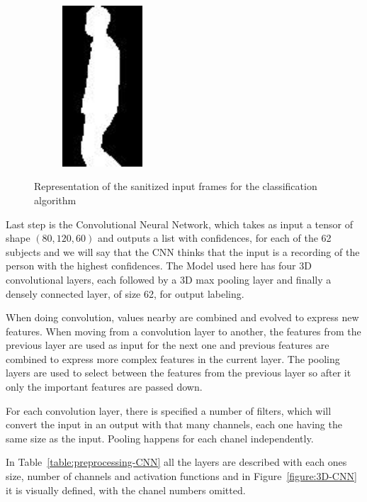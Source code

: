 \documentclass[12pt]{article}
\theoremstyle{definition}
\begin{document}
\begin{figure}[h]
\begin{subfigure}{3cm}
			\caption{}
		\end{subfigure}
		\hspace{0.5cm}
		\begin{subfigure}{3cm}
			\centering\includegraphics[width=3cm]{processed-slihouettes/90-4.jpg}
			\caption{}
		\end{subfigure}

		\caption{Representation of the sanitized input frames for the classification algorithm}
		\label{figure:preprocessed-silhouettes}
	\end{figure}

	Last step is the Convolutional Neural Network, which takes as input a tensor of shape $(80, 120, 60)$ and outputs a list with confidences, for each of the 62 subjects and we will say that the CNN thinks that the input is a recording of the person with the highest confidences.
	The Model used here has four 3D convolutional layers, each followed by a 3D max pooling layer and finally a densely connected layer, of size 62, for output labeling.

	When doing convolution, values nearby are combined and evolved to express new features. When moving from a convolution layer to another, the features from the previous layer are used as input for the next one and previous features are combined to express more complex features in the current layer. The pooling layers are used to select between the features from the previous layer so after it only the important features are passed down.

	For each convolution layer, there is specified a number of filters, which will convert the input in an output with that many channels, each one having the same size as the input. Pooling happens for each chanel independently.

	In Table~\ref{table:preprocessing-CNN} all the layers are described with each ones size, number of channels and activation functions and in Figure~\ref{figure:3D-CNN} it is visually defined, with the chanel numbers omitted.
\end{document}
